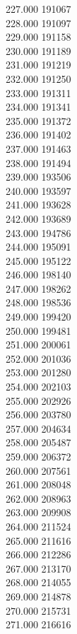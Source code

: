 { 227.000	191067 \\
 228.000	191097 \\
 229.000	191158 \\
 230.000	191189 \\
 231.000	191219 \\
 232.000	191250 \\
 233.000	191311 \\
 234.000	191341 \\
 235.000	191372 \\
 236.000	191402 \\
 237.000	191463 \\
 238.000	191494 \\
 239.000	193506 \\
 240.000	193597 \\
 241.000	193628 \\
 242.000	193689 \\
 243.000	194786 \\
 244.000	195091 \\
 245.000	195122 \\
 246.000	198140 \\
 247.000	198262 \\
 248.000	198536 \\
 249.000	199420 \\
 250.000	199481 \\
 251.000	200061 \\
 252.000	201036 \\
 253.000	201280 \\
 254.000	202103 \\
 255.000	202926 \\
 256.000	203780 \\
 257.000	204634 \\
 258.000	205487 \\
 259.000	206372 \\
 260.000	207561 \\
 261.000	208048 \\
 262.000	208963 \\
 263.000	209908 \\
 264.000	211524 \\
 265.000	211616 \\
 266.000	212286 \\
 267.000	213170 \\
 268.000	214055 \\
 269.000	214878 \\
 270.000	215731 \\
 271.000	216616 \\
}
